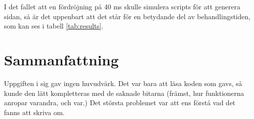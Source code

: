 \documentclass[a4paper, 11pt]{article}
\begin{document}
I det fallet att en fördröjning på 40 ms skulle simulera scripts för att generera sidan, så är det uppenbart
att det står för en betydande del av behandlingstiden, som kan ses i tabell \ref{tab:results}.


\section{Sammanfattning}

Uppgiften i sig gav ingen huvudvärk. Det var bara att läsa koden som gavs, så kunde den lätt kompletteras med
de saknade bitarna (främst, hur funktionerna anropar varandra, och var.) Det största problemet var att ens förstå vad
det fanns att skriva om.
\end{document}
